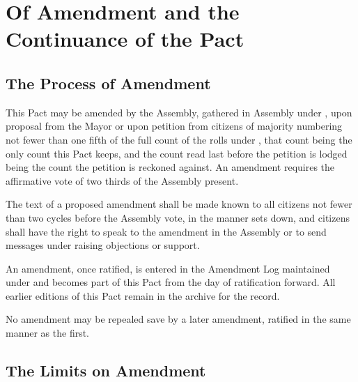 \chapter{Of Amendment and the Continuance of the Pact}
\label{art:amendment}


\section{The Process of Amendment}
\label{sec:amendment:process-of-amendment}

This Pact may be amended by the Assembly, gathered in Assembly under , upon proposal from the Mayor or upon petition from citizens of majority numbering not fewer than one fifth of the full count of the rolls under , that count being the only count this Pact keeps, and the count read last before the petition is lodged being the count the petition is reckoned against. An amendment requires the affirmative vote of two thirds of the Assembly present.

\begin{clauses}
\item The text of a proposed amendment shall be made known to all citizens not fewer than two cycles before the Assembly vote, in the manner  sets down, and citizens shall have the right to speak to the amendment in the Assembly or to send messages under  raising objections or support.
\item An amendment, once ratified, is entered in the Amendment Log maintained under  and becomes part of this Pact from the day of ratification forward. All earlier editions of this Pact remain in the archive for the record.
\item No amendment may be repealed save by a later amendment, ratified in the same manner as the first.
\end{clauses}

\section{The Limits on Amendment}
\label{sec:amendment:limits-on-amendment}

